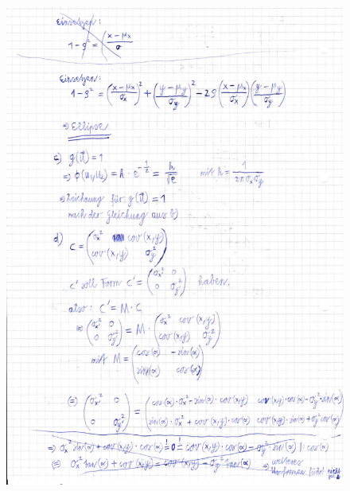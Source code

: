 \documentclass[
  bibliography=totoc,     %
  captions=tableheading,  %
  titlepage=firstiscover, %
]{scrartcl}
\begin{document}
  \begin{figure}[H]
    \centering
    \includegraphics[width=\textwidth]{IMG_20181101_0002.pdf}
  \end{figure}
\end{document}
